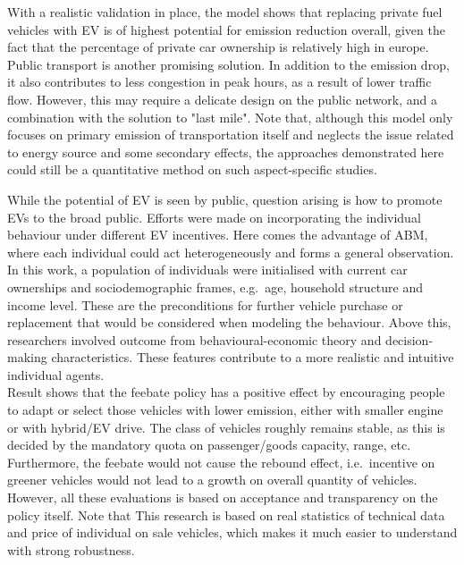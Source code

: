 \documentclass[12pt,twoside]{report}
\begin{document}
	With a realistic validation in place, the model shows that replacing private fuel vehicles with EV is of highest
	potential for emission reduction overall, given the fact that the percentage of private car ownership is
	relatively high in europe.
	Public transport is another promising solution.
	In addition to the emission drop, it also contributes to less congestion in peak hours, as a result of lower
	traffic flow.
	However, this may require a delicate design on the public network, and a combination with the solution to "last
	mile".
	Note that, although this model only focuses on primary emission of transportation itself and neglects the issue
	related to energy source and some secondary effects, the approaches demonstrated here could still be a quantitative
	method on such aspect-specific studies.\\
	\clearpage
	
	While the potential of EV is seen by public, question arising is how to promote EVs to the broad public.
	Efforts were made on incorporating the individual behaviour under different EV incentives\cite{MUELLER20091072}.
	Here comes the advantage of ABM, where each individual could act heterogeneously and forms a general observation.
	In this work, a population of individuals were initialised with current car ownerships and sociodemographic frames,
	e.g.\ age, household structure and income level.
	These are the preconditions for further vehicle purchase or replacement that would be considered when modeling
	the behaviour.
	Above this, researchers involved outcome from behavioural-economic theory and decision-making characteristics.
	These features contribute to a more realistic and intuitive individual agents.\\
	
	Result shows that the feebate policy has a positive effect by encouraging people to adapt or select those
	vehicles with lower emission, either with smaller engine or with hybrid/EV drive.
	The class of vehicles roughly remains stable, as this is decided by the mandatory quota on passenger/goods
	capacity, range, etc.
	Furthermore, the feebate would not cause the rebound effect, i.e.\ incentive on greener vehicles would not lead
	to a growth on overall quantity of vehicles.
	However, all these evaluations is based on acceptance and transparency on the policy itself.
	Note that This research is based on real statistics of technical data and price of individual on sale vehicles,
	which makes it much easier to understand with strong robustness.
	
\end{document}
